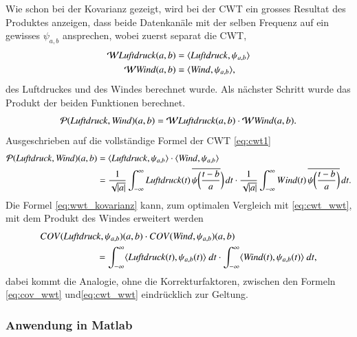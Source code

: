 \begin{refsection}
Wie schon bei der Kovarianz gezeigt, wird bei der CWT ein grosses Resultat des Produktes anzeigen, dass beide Datenkanäle mit der selben Frequenz auf ein gewisses $\psi_{a,b}$ ansprechen,  wobei zuerst separat die CWT, 
\begin{align}
\mathcal{W}\text{\textit{Luftdruck}}(a,b) &= \langle \text{\textit{Luftdruck}},\psi_{a,b}\rangle
\\
\mathcal{W}\text{\textit{Wind}}(a,b) &= \langle \text{\textit{Wind}},\psi_{a,b}\rangle,
\end{align}
des Luftdruckes und des Windes berechnet wurde.
Als nächster Schritt wurde das Produkt der beiden Funktionen berechnet.
\begin{equation}
\mathcal{P}(\text{\textit{Luftdruck}},\text{\textit{Wind}})(a,b) = \mathcal{W}\text{\textit{Luftdruck}}(a,b) \cdot \mathcal{W}\text{\textit{Wind}}(a,b).
\label{eq:produkt-wwt}
\end{equation}
Ausgeschrieben auf die vollständige Formel der CWT \eqref{eq:cwt1}
\begin{align}
\mathcal{P}(\text{\textit{Luftdruck}},\text{\textit{Wind}})(a,b)
&=
\langle \text{\textit{Luftdruck}},\psi_{a,b}\rangle \cdot \langle \text{\textit{Wind}},\psi_{a,b} \rangle
\notag
\\
&=
\frac{1}{\sqrt{|a|}}\int_{-\infty}^\infty \text{\textit{Luftdruck}}(t)\,\overline{
	\psi\biggl(\frac{t-b}{a}}\biggr)\,dt
\cdot
\frac{1}{\sqrt{|a|}}\int_{-\infty}^\infty Wind(t)\,\overline{
	\psi\biggl(\frac{t-b}{a}\biggr)}\,dt .
\label{eq:cwt_wwt}
\end{align}
Die Formel \eqref{eq:wwt_kovarianz} kann, zum optimalen Vergleich mit \eqref{eq:cwt_wwt}, mit dem Produkt des Windes erweitert werden
\begin{equation}
\begin{split}
COV(\text{\textit{Luftdruck}}, \psi_{a,b})(a,b)\cdot COV(\text{\textit{Wind}}, \psi_{a,b})(a,b) \hspace{3cm} \\
=  \int _{-\infty}^\infty \langle \text{\textit{Luftdruck}}(t),\psi_{a,b}(t)\rangle \text{\space}dt \cdot \int _{-\infty}^\infty \langle \text{\textit{Wind}}(t),\psi_{a,b}(t)\rangle \text{\space}dt,
\label{eq:cov_wwt}
\end{split}
\end{equation}
dabei kommt die Analogie, ohne die Korrekturfaktoren, zwischen den Formeln \eqref{eq:cov_wwt} und\eqref{eq:cwt_wwt} eindrücklich zur Geltung.

\subsubsection{Anwendung in Matlab}


\end{refsection}
